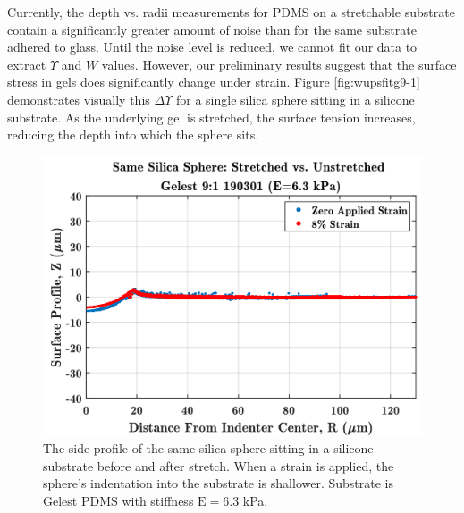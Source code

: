 Currently, the depth vs. radii measurements for PDMS on a stretchable substrate contain a significantly greater amount of noise than for the same substrate adhered to glass. Until the noise level is reduced, we cannot fit our data to extract $ \Upsilon $ and $ W $ values. However, our preliminary results suggest that the surface stress in gels does significantly change under strain. Figure \ref{fig:wupsfitg9-1} demonstrates visually this $ \Delta\Upsilon $ for a single silica sphere sitting in a silicone substrate. As the underlying gel is stretched, the surface tension increases, reducing the depth into which the sphere sits. 
\begin{figure}[h!]
	\centering
	\includegraphics[width=\linewidth]{Chapters/Figures/stretch_v_unstretched_0-88-ST1_INTRO}
	\caption[Side Collapse Comparison]{The side profile of the same silica sphere sitting in a silicone substrate before and after stretch. When a strain is applied, the sphere's indentation into the substrate is shallower. Substrate is Gelest PDMS with stiffness $\text{E}=6.3$ kPa.}	
	\label{fig:sc1unstretchedv8ml}
\end{figure}

